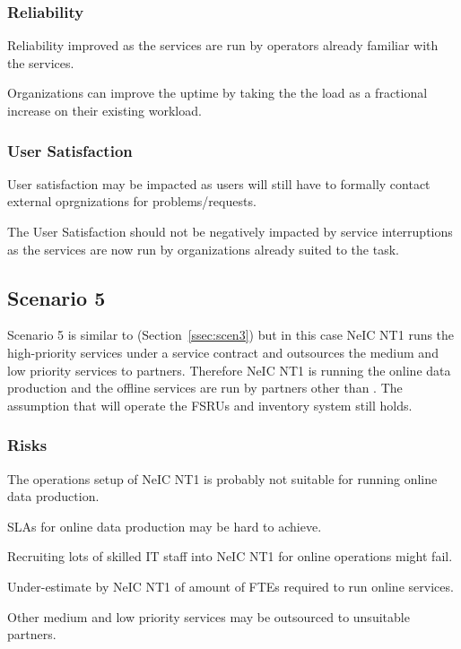 \documentclass[12pt,a4paper]{article}
\newcommand{\nnt}{NeIC NT1\xspace}
\begin{document}
\subsubsection*{Reliability}
\bitm
\item Reliability improved as the services are run by operators already familiar with the services.
\item Organizations can improve the uptime by taking the the \ED load as a fractional increase on their existing workload.
\eitm

\subsubsection*{User Satisfaction}
\bitm
\item User satisfaction may be impacted as \EC users will still have to formally contact external oprgnizations for problems/requests.
\item The User Satisfaction should not be negatively impacted by service interruptions as the services are now
  run by organizations already suited to the task.
\eitm
  
\subsection{Scenario 5}
\label{ssec:scen5}

Scenario 5 is similar to (Section~\ref{ssec:scen3}) but in this case \nnt runs the high-priority services under a
service contract and \EC outsources the medium and low priority services to partners.
Therefore NeIC NT1 is running the online data production and the offline services are run by partners other than \EC.
The assumption that \EC will operate the FSRUs and inventory system still holds.

\subsubsection*{Risks}
\bitm
  \item The operations setup of NeIC NT1 is probably not suitable for running online data production.
  \item SLAs for online data production may be hard to achieve.
  \item Recruiting lots of skilled IT staff into \nnt for online operations might fail.
  \item Under-estimate by \nnt of amount of FTEs required to run online services.
  \item Other medium and low priority services may be outsourced to unsuitable partners.
\eitm
\end{document}
